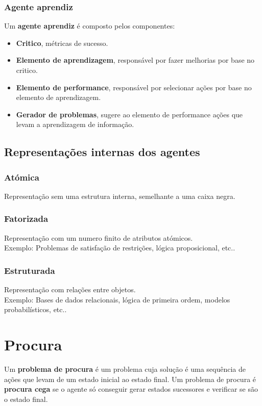 \documentclass[]{report}
\begin{document}
\subsection{Agente aprendiz}
Um \textbf{agente aprendiz} é composto pelos componentes:
\begin{itemize}
	\item \textbf{Critico}, métricas de sucesso.
	\item \textbf{Elemento de aprendizagem}, responsável por fazer melhorias por base no critico.
	\item \textbf{Elemento de performance}, responsável por selecionar ações por base no elemento de aprendizagem.
	\item \textbf{Gerador de problemas}, sugere ao elemento de performance ações que levam a aprendizagem de informação.
\end{itemize}
\section{Representações internas dos agentes}
\subsection{Atómica}
Representação sem uma estrutura interna, semelhante a uma caixa negra.
\subsection{Fatorizada}
Representação com um numero finito de atributos atómicos.\\
Exemplo: Problemas de satisfação de restrições, lógica proposicional, etc..
\subsection{Estruturada}
Representação com relações entre objetos.\\
Exemplo: Bases de dados relacionais, lógica de primeira ordem, modelos probabilísticos, etc..
\chapter{Procura}
Um \textbf{problema de procura} é um problema cuja solução é uma sequência de ações que levam de um estado inicial ao estado final. Um problema de procura é \textbf{procura cega} se o agente só conseguir gerar estados sucessores e verificar se são o estado final.
\end{document}
